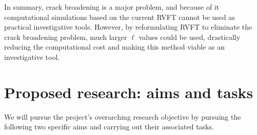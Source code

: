 \documentclass[10pt,letterpaper]{article}
\begin{document}
    In summary, crack broadening is a major problem, and because of it computational simulations based on the current RVFT cannot be used as practical investigative tools. However, by reformulating RVFT to eliminate the crack broadening problem, much larger $\ell$ values could be used, drastically reducing the computational cost and making this method viable as an investigative tool.

\section{Proposed research: aims and tasks}
    \label{s:aims}
    We will pursue the project's overarching  research objective by pursuing the following two specific aims and carrying out their associated tasks.
\end{document}
